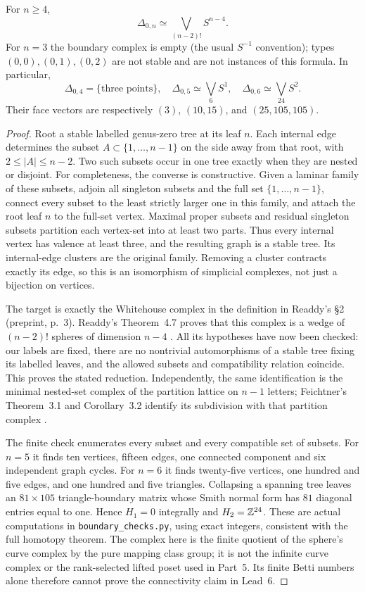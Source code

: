 \begin{theorem}
\label{P4d2}
For $n\ge4$,
\[
 \Delta_{0,n}\simeq\bigvee_{(n-2)!}S^{n-4}.
\]
For $n=3$ the boundary complex is empty (the usual $S^{-1}$ convention); types $(0,0),(0,1),(0,2)$ are not stable and are not instances of this formula.  In particular,
\[
 \Delta_{0,4}=\{\text{three points}\},\quad
 \Delta_{0,5}\simeq\bigvee_6S^1,\quad
 \Delta_{0,6}\simeq\bigvee_{24}S^2.
\]
Their face vectors are respectively $(3)$, $(10,15)$, and $(25,105,105)$.
\end{theorem}
\begin{proof}
Root a stable labelled genus-zero tree at its leaf $n$.  Each internal edge determines the subset $A\subset\{1,\ldots,n-1\}$ on the side away from that root, with $2\le|A|\le n-2$.  Two such subsets occur in one tree exactly when they are nested or disjoint.  For completeness, the converse is constructive.  Given a laminar family of these subsets, adjoin all singleton subsets and the full set $\{1,\ldots,n-1\}$, connect every subset to the least strictly larger one in this family, and attach the root leaf $n$ to the full-set vertex.  Maximal proper subsets and residual singleton subsets partition each vertex-set into at least two parts.  Thus every internal vertex has valence at least three, and the resulting graph is a stable tree.  Its internal-edge clusters are the original family.  Removing a cluster contracts exactly its edge, so this is an isomorphism of simplicial complexes, not just a bijection on vertices.

The target is exactly the Whitehouse complex in the definition in Readdy's \S2 (preprint, p.~3).  Readdy's Theorem~4.7 proves that this complex is a wedge of $(n-2)!$ spheres of dimension $n-4$ \cite{Readdy2005}.  All its hypotheses have now been checked: our labels are fixed, there are no nontrivial automorphisms of a stable tree fixing its labelled leaves, and the allowed subsets and compatibility relation coincide.  This proves the stated reduction.  Independently, the same identification is the minimal nested-set complex of the partition lattice on $n-1$ letters; Feichtner's Theorem~3.1 and Corollary~3.2 identify its subdivision with that partition complex \cite{Feichtner2006}.

The finite check enumerates every subset and every compatible set of subsets.  For $n=5$ it finds ten vertices, fifteen edges, one connected component and six independent graph cycles.  For $n=6$ it finds twenty-five vertices, one hundred and five edges, and one hundred and five triangles.  Collapsing a spanning tree leaves an $81\times105$ triangle-boundary matrix whose Smith normal form has $81$ diagonal entries equal to one.  Hence $H_1=0$ integrally and $H_2=\mathbb Z^{24}$.  These are actual computations in \texttt{boundary\_checks.py}, using exact integers, consistent with the full homotopy theorem.  The complex here is the finite quotient of the sphere's curve complex by the pure mapping class group; it is not the infinite curve complex or the rank-selected lifted poset used in Part~5.  Its finite Betti numbers alone therefore cannot prove the connectivity claim in Lead~6.
\end{proof}

